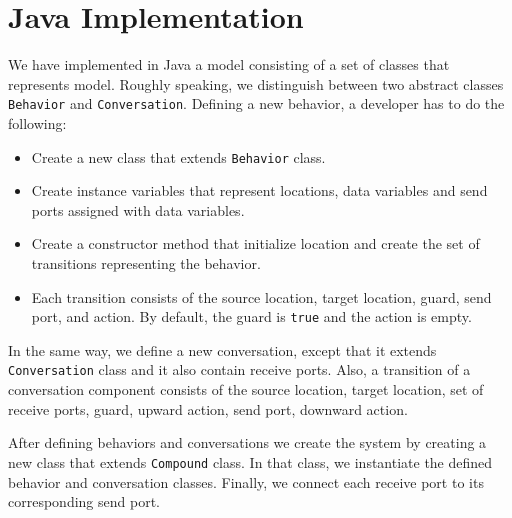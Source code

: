 
\section{Java Implementation}
\label{sec:java}
We have implemented in Java a model consisting of a set of classes that represents {\compmodel} model. Roughly speaking, we distinguish between two abstract classes \texttt{Behavior} and \texttt{Conversation}. Defining a new behavior, a developer has to do the following: 
\begin{itemize}
\item Create a new class that extends \texttt{Behavior} class. 
\item Create instance variables that represent locations, data variables and send ports assigned with data variables.
\item Create a constructor method that initialize location and create the set of transitions representing the behavior. 
\item Each transition consists of the source location, target location, guard, send port,  and action. By default, the guard is \texttt{true} and the action is empty.  
\end{itemize}
In the same way, we define a new conversation, except that it extends \texttt{Conversation} class and it also contain receive ports. Also, a transition of a conversation component consists of the source location, target location, set of receive ports, guard, upward action, send port, downward action. 

After defining behaviors and conversations we create the system by creating a new class that extends \texttt{Compound} class. In that class, we instantiate the defined behavior and conversation classes. Finally, we connect each receive port to its corresponding send port. 


